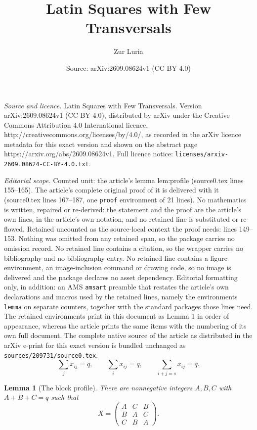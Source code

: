\documentclass[10pt,a4paper]{amsart}
\title{Latin Squares with Few Transversals}
\author{Zur Luria}
\date{Source: arXiv:2609.08624v1 (CC BY 4.0)}
\newtheorem{lemma}{Lemma}
\begin{document}
\maketitle

\noindent\emph{Source and licence.} Latin Squares with Few Transversals. Version arXiv:2609.08624v1 (CC BY 4.0), distributed by arXiv under the Creative Commons Attribution 4.0 International licence, http://creativecommons.org/licenses/by/4.0/, as recorded in the arXiv licence metadata for this exact version and shown on the abstract page https://arxiv.org/abs/2609.08624v1. Full licence notice: \texttt{licenses/arxiv-2609.08624-CC-BY-4.0.txt}.\par\smallskip

\noindent\textit{Editorial scope.} Counted unit: the article's lemma lem:profile (source0.tex lines 155--165). The article's complete original proof of it is delivered with it (source0.tex lines 167--187, one \texttt{proof} environment of 21 lines). No mathematics is written, repaired or re-derived: the statement and the proof are the article's own lines, in the article's own notation, and no retained line is substituted or re-flowed.  Retained uncounted as the source-local context the proof needs: lines 149--153.  Nothing was omitted from any retained span, so the package carries no omission record.  No retained line contains a citation, so the wrapper carries no bibliography and no bibliography entry.  No retained line contains a figure environment, an image-inclusion command or drawing code, so no image is delivered and the package declares no asset dependency.  Editorial formatting only, in addition: an AMS \texttt{amsart} preamble that restates the article's own declarations and macros used by the retained lines, namely the environments \texttt{lemma} on separate counters, together with the standard packages those lines need.  The retained environments print in this document as Lemma 1 in order of appearance, whereas the article prints the same items with the numbering of its own full document.  The complete native source of the article as distributed in the arXiv e-print for this exact version is bundled unchanged as \texttt{sources/209731/source0.tex}.
\begin{equation}\label{eq:line-sums}
 \sum_jx_{ij}=q,\qquad
 \sum_ix_{ij}=q,\qquad
 \sum_{i+j=s}x_{ij}=q.
\end{equation}

\begin{lemma}[The block profile]\label{lem:profile}
There are nonnegative integers $A,B,C$ with $A+B+C=q$ such that
\begin{equation}\label{eq:profile}
X=
\begin{pmatrix}
 A&C&B\\
 B&A&C\\
 C&B&A
\end{pmatrix}.
\end{equation}
\end{lemma}
\end{document}
